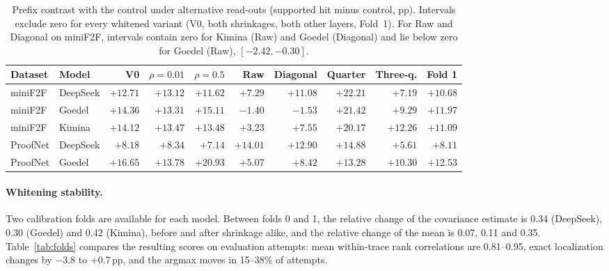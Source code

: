 \begin{table}[h]
\caption{Prefix contrast with the control under alternative read-outs (supported hit minus control, pp). Intervals exclude zero for every whitened variant (V0, both shrinkages, both other layers, Fold~1). For Raw and Diagonal on miniF2F, intervals contain zero for Kimina (Raw) and Goedel (Diagonal) and lie below zero for Goedel (Raw), $[-2.42, -0.30]$.}
\label{tab:sensprefix}
\begin{center}
\footnotesize
\setlength{\tabcolsep}{3.5pt}
\begin{tabular}{llrrrrrrrr}
\toprule
Dataset & Model & V0 & $\rho=0.01$ & $\rho=0.5$ & Raw & Diagonal & Quarter & Three-q. & Fold 1\\
\midrule
miniF2F & DeepSeek & $+12.71$ & $+13.12$ & $+11.62$ & $+7.29$ & $+11.08$ & $+22.21$ & $+7.19$ & $+10.68$\\
miniF2F & Goedel & $+14.36$ & $+13.31$ & $+15.11$ & $-1.40$ & $-1.53$ & $+21.42$ & $+9.29$ & $+11.97$\\
miniF2F & Kimina & $+14.12$ & $+13.47$ & $+13.48$ & $+3.23$ & $+7.55$ & $+20.17$ & $+12.26$ & $+11.09$\\
ProofNet & DeepSeek & $+8.18$ & $+8.34$ & $+7.14$ & $+14.01$ & $+12.90$ & $+14.88$ & $+5.61$ & $+8.11$\\
ProofNet & Goedel & $+16.65$ & $+13.78$ & $+20.93$ & $+5.07$ & $+8.42$ & $+13.28$ & $+10.30$ & $+12.53$\\
\bottomrule
\end{tabular}
\end{center}
\end{table}

\paragraph{Whitening stability.} Two calibration folds are available for each model. Between folds 0 and 1, the relative change of the covariance estimate is 0.34 (DeepSeek), 0.30 (Goedel) and 0.42 (Kimina), before and after shrinkage alike, and the relative change of the mean is 0.07, 0.11 and 0.35. Table~\ref{tab:folds} compares the resulting scores on evaluation attempts: mean within-trace rank correlations are 0.81--0.95, exact localization changes by $-3.8$ to $+0.7$\,pp, and the argmax moves in 15--38\% of attempts.

